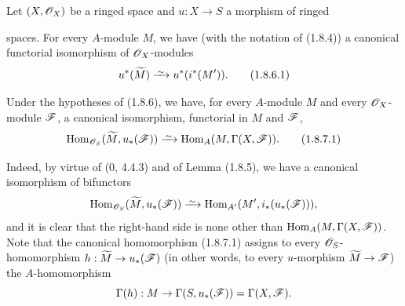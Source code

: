 \begin{corollary}[1.8.6]
\label{ega2:addendum:I.1.8.6}
Let $(X,\mathscr{O}_X)$ be a ringed space and $u:X\to S$ a morphism
of ringed
spaces. For every $A$-module $M$, we have (with the notation of (1.8.4)) a
canonical functorial isomorphism of $\mathscr{O}_X$-modules
\begin{equation}
\label{ega2:addendum:I.1.8.6.1}
  u^*(\widetilde M)\isoto u^*(i^*(M')).
\tag{1.8.6.1}
\end{equation}
\end{corollary}

\begin{corollary}[1.8.7]
\label{ega2:addendum:I.1.8.7}
Under the hypotheses of (1.8.6), we have, for every $A$-module $M$ and every
$\mathscr{O}_X$-module $\mathscr{F}$, a canonical isomorphism, functorial in
$M$ and $\mathscr{F}$,
\begin{equation}
\label{ega2:addendum:I.1.8.7.1}
  \Hom_{\sh{O}_S}(\widetilde M,u_*(\sh{F}))
  \isoto\Hom_A(M,\Gamma(X,\sh{F})).
\tag{1.8.7.1}
\end{equation}
\end{corollary}

Indeed, by virtue of (0, 4.4.3) and of Lemma (1.8.5), we have a
canonical isomorphism of bifunctors
\[
  \Hom_{\sh{O}_S}(\widetilde M,u_*(\sh{F}))
  \isoto\Hom_{A'}(M',i_*(u_*(\sh{F}))),
\]
and it is clear that the right-hand side is none other than
$\operatorname{Hom}_A(M,\Gamma(X,\mathscr{F}))$. Note that the canonical homomorphism
(1.8.7.1) assigns to every $\mathscr{O}_S$-homomorphism
$h:\widetilde M\to u_*(\mathscr{F})$ (in other words, to every $u$-morphism
$\widetilde M\to\mathscr{F}$) the $A$-homomorphism
\[
  \Gamma(h):M\to\Gamma(S,u_*(\mathscr{F}))=\Gamma(X,\mathscr{F}).
\]

